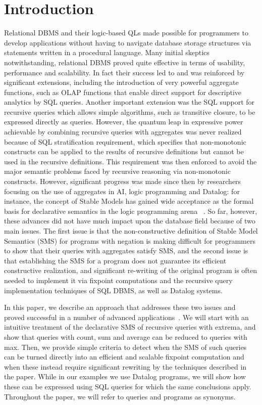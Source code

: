 \documentclass[11pt]{article}
\begin{document}
\section{{\large  \bf Introduction}}
Relational DBMS and their logic-based  QLs made possible for programmers to develop
applications without having to navigate   database 
storage structures via statements written in a procedural language. 
Many initial skeptics notwithstanding, relational DBMS  proved quite effective  in terms
of usability, performance and  scalability.  In fact their success led to and was reinforced by
significant extensions, including the introduction 
of very powerful aggregate functions, such as OLAP functions that enable direct support
for descriptive analytics by SQL queries. Another important extension was the  SQL support for  recursive queries
which allows  simple algorithms, such as transitive closure, to be expressed directly as  queries.
However, the quantum leap in expressive power achievable  by  combining recursive queries 
with aggregates was never realized  because of  SQL stratification requirement,
which specifies that non-monotonic constructs can be applied to the results of 
recursive definitions but cannot be used in the recursive definitions. This
requirement was  then enforced to avoid the major semantic problems faced by recursive reasoning
via non-monotonic constructs. However, significant progress was made since then
 by researchers  focusing on the use of aggregates in  AI,  logic programming and Datalog: 
 for instance, the concept of Stable Models has gained wide acceptance as the formal basis
 for declarative semantics  in the logic programming arena~\cite{gl:stable} \cite{DBLP:journals/tplp/GelfondZ14}.
So far, however, these advances  did not have much  impact upon the database field because
of two main issues. 
The first issue is that the  non-constructive definition of  Stable Model Semantics (SMS)  for programs with negation is making 
difficult for programmers to show that their queries with aggregates 
satisfy  SMS, and the second issue is that  establishing the SMS for a program does not guarantee its efficient
constructive realization, and significant re-writing of the original program is often needed to 
implement it via fixpoint computations and  the recursive query implementation techniques of SQL DBMS, 
as well as Datalog systems.

In this paper, we describe an approach that addresses these two issues and proved successful in a number of advanced 
applications~\cite{bigdatalog,bigdatalog-mc,rasql,afrati2011map,rasqldemoSigmod20,datalogml,kddlog}. 
We will start with an intuitive  treatment of the declarative SMS  of
 recursive queries with  extrema,  and show that queries with count, sum and average can
 be reduced to queries with max. Then, we provide simple criteria to detect when
the SMS of such queries can be turned directly into an efficient and scalable fixpoint computation
and when these instead require   significant rewriting  by the techniques described in the paper.
While in our examples we use Datalog programs, we will show how these can be expressed using
SQL queries for which the same conclusions apply. Throughout the paper, we will refer to 
queries and programs as synonyms.
\end{document}
